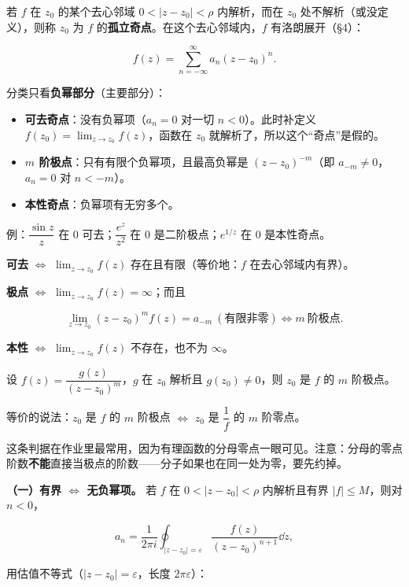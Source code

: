 \documentclass[11pt]{ctexart}
\let\origsubhdr\subhdr
\renewcommand{\subhdr}[1]{\par\needspace{4\baselineskip}\origsubhdr{#1}}
\begin{document}
若 $f$ 在 $z_0$ 的某个去心邻域 $0<|z-z_0|<\rho$ 内解析，而在 $z_0$ 处不解析（或没定义），则称 $z_0$ 为 $f$ 的\textbf{孤立奇点}。在这个去心邻域内，$f$ 有洛朗展开（§4）：

\[ f(z)=\sum_{n=-\infty}^{\infty}a_n(z-z_0)^n . \]

分类只看\textbf{负幂部分}（主要部分）：

\begin{itemize}
\item \textbf{可去奇点}：没有负幂项（$a_n=0$ 对一切 $n<0$）。此时补定义 $f(z_0)=\lim_{z\to z_0}f(z)$，函数在 $z_0$ 就解析了，所以这个“奇点”是假的。
\item \textbf{$m$ 阶极点}：只有有限个负幂项，且最高负幂是 $(z-z_0)^{-m}$（即 $a_{-m}\ne0$，$a_n=0$ 对 $n<-m$）。
\item \textbf{本性奇点}：负幂项有无穷多个。
\end{itemize}

例：$\dfrac{\sin z}{z}$ 在 $0$ 可去；$\dfrac{e^z}{z^2}$ 在 $0$ 是二阶极点；$e^{1/z}$ 在 $0$ 是本性奇点。


\textbf{可去} $\iff$ $\lim_{z\to z_0}f(z)$ 存在且有限（等价地：$f$ 在去心邻域内有界）。

\textbf{极点} $\iff$ $\lim_{z\to z_0}f(z)=\infty$；而且

\[ \lim_{z\to z_0}(z-z_0)^m f(z)=a_{-m}\ (\text{有限非零})\iff m\ \text{阶极点} . \]

\textbf{本性} $\iff$ $\lim_{z\to z_0}f(z)$ 不存在，也不为 $\infty$。


设 $f(z)=\dfrac{g(z)}{(z-z_0)^m}$，$g$ 在 $z_0$ 解析且 $g(z_0)\ne0$，则 $z_0$ 是 $f$ 的 $m$ 阶极点。

等价的说法：$z_0$ 是 $f$ 的 $m$ 阶极点 $\iff$ $z_0$ 是 $\dfrac{1}{f}$ 的 $m$ 阶零点。

这条判据在作业里最常用，因为有理函数的分母零点一眼可见。注意：分母的零点阶数\textbf{不能}直接当极点的阶数——分子如果也在同一处为零，要先约掉。


\textbf{（一）有界 $\iff$ 无负幂项。}
若 $f$ 在 $0<|z-z_0|<\rho$ 内解析且有界 $|f|\le M$，则对 $n<0$，

\[ a_n=\frac{1}{2\pi i}\oint_{|z-z_0|=\varepsilon}\frac{f(z)}{(z-z_0)^{n+1}}\dd z , \]

用估值不等式（$|z-z_0|=\varepsilon$，长度 $2\pi\varepsilon$）：
\end{document}
